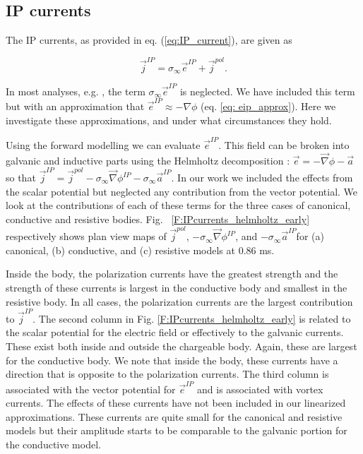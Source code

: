 \documentclass[extra,mreferee]{gji}
\newcommand{\grad}{\vec \nabla}
\newcommand{\siginf}{\sigma_\infty}
\renewcommand {\j}  { {\vec j} }
\newcommand {\e}  { {\vec e} }
\begin{document}
\subsection{IP currents}
The IP currents, as provided in eq. (\ref{eq:IP_current}), are given as 
\begin{linenomath*}
\begin{equation}
  \j^{IP}=\siginf  \e^{IP} + \j^{pol}.
\end{equation}
\end{linenomath*}

In most analyses, e.g. \cite{Smith1988a}, the term $\siginf \e^{IP}$ is neglected. We have included this term but with an approximation that $\e^{IP} \approx -\nabla \phi$  (eq. \ref{eq: eip_approx}). Here we investigate these approximations, and under what circumstances they hold. 

Using the forward modelling we can evaluate $\e^{IP}$.
This field can be broken into galvanic and inductive parts using the Helmholtz decomposition \cite[]{Bladel}: $\e=-\grad \phi-\vec{a}$ so that $\j^{IP} = \j^{pol} -\siginf \grad\phi^{IP} - \siginf \vec{a}^{IP}$.
In our work we included the effects from the scalar potential but neglected any contribution from the vector potential. We look at the contributions of each of these terms  for the three cases of canonical, conductive and resistive bodies. 
Fig. ~\ref{F:IPcurrents_helmholtz_early} respectively shows plan view maps of $\j^{pol}$, $-\siginf \grad\phi^{IP}$, and $-\siginf \vec{a}^{IP}$for (a) canonical, (b) conductive, and (c) resistive models at 0.86 ms. 

Inside the body, the polarization currents have the greatest strength and the strength of these currents is largest in the conductive body and smallest in the resistive body.
In all cases, the polarization currents are the largest contribution to $\j^{IP}$. 
The second column in Fig. \ref{F:IPcurrents_helmholtz_early} is related to the scalar potential for the electric field or effectively to the galvanic currents. 
These exist both inside and outside the chargeable body.
Again, these are largest for the conductive body. 
We note that inside the body, these currents have a direction that is opposite to the polarization currents. 
The third column is associated with the vector potential for $\e^{IP}$ and is associated with vortex currents. 
The effects of these currents have not been included in our linearized approximations. These currents are quite small for the canonical and resistive models but their amplitude starts to be comparable to the galvanic portion for the conductive model. 
\end{document}
